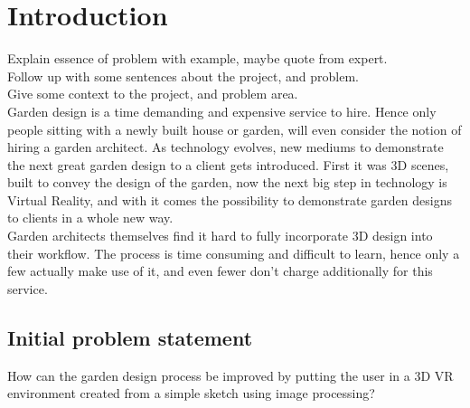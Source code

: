 \chapter{Introduction}
	
	Explain essence of problem with example, maybe quote from expert.\\
	Follow up with some sentences about the project, and problem.\\
	Give some context to the project, and problem area.\\
	
	Garden design is a time demanding and expensive service to hire. Hence only people sitting with a newly built house or garden, will even consider the notion of hiring a garden architect. As technology evolves, new mediums to demonstrate the next great garden design to a client gets introduced\cite{landscapeArchitectureDigiTech}. First it was 3D scenes, built to convey the design of the garden, now the next big step in technology is Virtual Reality\cite{VRS}, and with it comes the possibility to demonstrate garden designs to clients in a whole new way.\\
	
	Garden architects themselves find it hard to fully incorporate 3D design into their workflow. The process is time consuming and difficult to learn, hence only a few actually make use of it, and even fewer don't charge additionally for this service. 
	
	\section{Initial problem statement}
	How can the garden design process be improved by putting the user in a 3D VR environment created from a simple sketch using image processing?
	